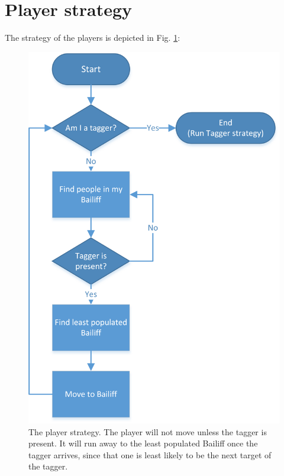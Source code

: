 \documentclass[conference, a4paper]{IEEEtran}
\begin{document}
\section{Player strategy}
The strategy of the players is depicted in Fig. \ref{player-strategy}:
\begin{figure}[h!]
	\centering
	\includegraphics[scale=0.8]{player-strategy}
	\caption{The player strategy. The player will not move unless the tagger is present. It will run away to the least populated Bailiff once the tagger arrives, since that one is least likely to be the next target of the tagger.}
	\label{player-strategy}
\end{figure}
\end{document}
